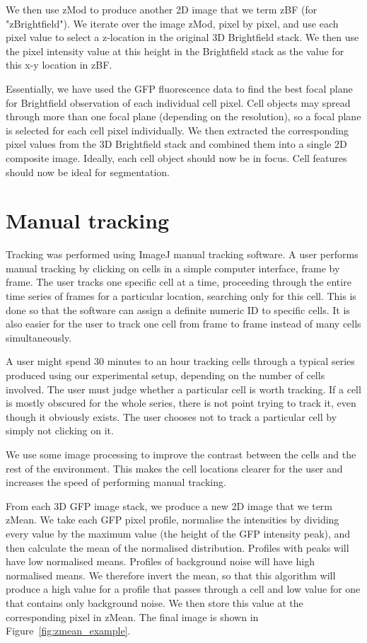 We then use zMod to produce another 2D image that we term zBF (for "zBrightfield"). We iterate over the image zMod, pixel by pixel, and use each pixel value to select a z-location in the original 3D Brightfield stack. We then use the pixel intensity value at this height in the Brightfield stack as the value for this x-y location in zBF.

Essentially, we have used the GFP fluorescence data to find the best focal plane for Brightfield observation of each individual cell pixel. Cell objects may spread through more than one focal plane (depending on the resolution), so a focal plane is selected for each cell pixel individually. We then extracted the corresponding pixel values from the 3D Brightfield stack and combined them into a single 2D composite image. Ideally, each cell object should now be in focus. Cell features should now be ideal for segmentation.

\section{Manual tracking}

Tracking was performed using ImageJ manual tracking software. A user performs manual tracking by clicking on cells in a simple computer interface, frame by frame. The user tracks one specific cell at a time, proceeding through the entire time series of frames for a particular location, searching only for this cell. This is done so that the software can assign a definite numeric ID to specific cells. It is also easier for the user to track one cell from frame to frame instead of many cells simultaneously.

A user might spend 30 minutes to an hour tracking cells through a typical series produced using our experimental setup, depending on the number of cells involved. The user must judge whether a particular cell is worth tracking. If a cell is mostly obscured for the whole series, there is not point trying to track it, even though it obviously exists. The user chooses not to track a particular cell by simply not clicking on it.

We use some image processing to improve the contrast between the cells and the rest of the environment. This makes the cell locations clearer for the user and increases the speed of performing manual tracking.

From each 3D GFP image stack, we produce a new 2D image that we term zMean. We take each GFP pixel profile, normalise the intensities by dividing every value by the maximum value (the height of the GFP intensity peak), and then calculate the mean of the normalised distribution. Profiles with peaks will have low normalised means. Profiles of background noise will have high normalised means. We therefore invert the mean, so that this algorithm will produce a high value for a profile that passes through a cell and low value for one that contains only background noise. We then store this value at the corresponding pixel in zMean. The final image is shown in Figure~\ref{fig:zmean_example}.

